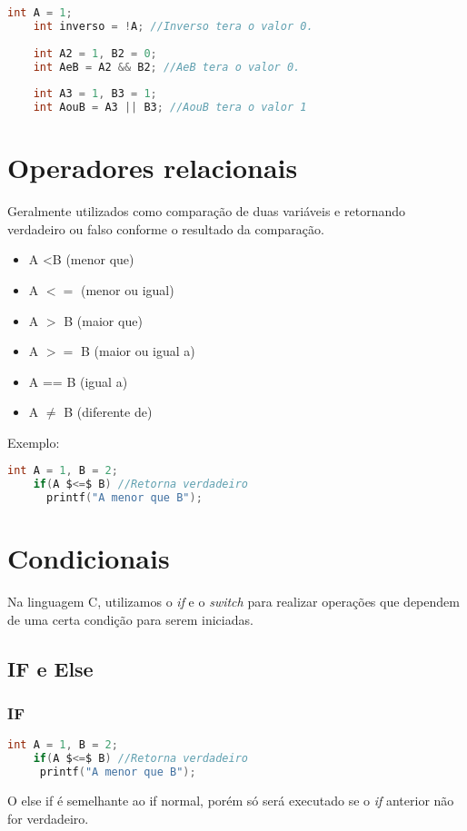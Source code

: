 \documentclass[12pt]{article}
\begin{document}
\begin{lstlisting}[language=C]
	int A = 1;
	int inverso = !A; //Inverso tera o valor 0.
	
	int A2 = 1, B2 = 0;
	int AeB = A2 && B2; //AeB tera o valor 0.
	
	int A3 = 1, B3 = 1;
	int AouB = A3 || B3; //AouB tera o valor 1
\end{lstlisting}

\section{Operadores relacionais}
Geralmente utilizados como comparação de duas variáveis e retornando verdadeiro ou falso conforme o resultado da comparação.

\begin{itemize}
	\item A \textless B (menor que)
	\item A $<=$ (menor ou igual)
	\item A $>$ B (maior que)
	\item A $>=$ B (maior ou igual a)
	\item A == B (igual a)
	\item A $\neq$ B (diferente de)
	
\end{itemize}
Exemplo:
\begin{lstlisting}[language=C,mathescape=true]
	int A = 1, B = 2;
	if(A $<=$ B) //Retorna verdadeiro
	  printf("A menor que B");
\end{lstlisting}

\newpage
\section{Condicionais}

Na linguagem C, utilizamos o \textit{if} e o \textit{switch} para realizar operações que dependem de uma certa condição para serem iniciadas.

\subsection{IF e Else}
\subsubsection{IF}
\begin{lstlisting}[language=C,mathescape=true]
	int A = 1, B = 2;
	if(A $<=$ B) //Retorna verdadeiro
	 printf("A menor que B");
\end{lstlisting}
O else if é semelhante ao if normal, porém só será executado se o \textit{if} anterior não for verdadeiro.
\end{document}
